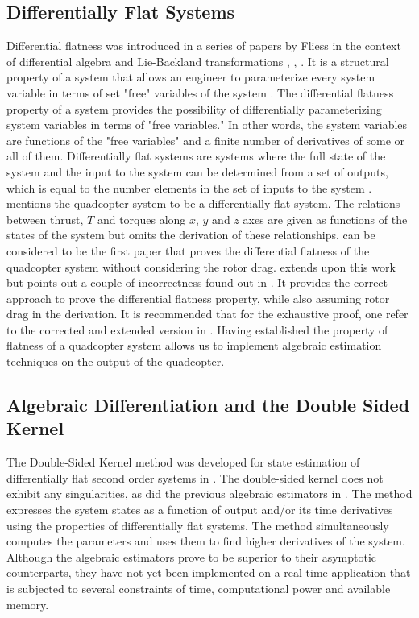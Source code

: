 \documentclass[letterpaper%
, twoside%
, 12pt%
,memoire%
, english%
,creativecommons,hyperref%
]{thETS}
\begin{document}
\begin{introduction}
\subsection{Differentially Flat Systems} \label{subsec:diffflatnessquad}
Differential flatness was introduced in a series of papers by Fliess in the context of differential algebra and Lie-Backland transformations \citep{RN78}, \citep{RN79}, \citep{RN80}. It is a structural property of a system that allows an engineer to parameterize every system variable in terms of set "free" variables of the system \citep{RN77}. 
The differential flatness property of a system provides the possibility of differentially parameterizing system variables in terms of "free variables." In other words, the system variables are functions of the "free variables" and a finite number of derivatives of some or all of them.
Differentially flat systems are systems where the full state of the system and the input to the system can be determined from a set of outputs, which is equal to the number elements in the set of inputs to the system \citep{RN73}. 
\citep{RN81} mentions the quadcopter system to be a differentially flat system.  The relations between thrust, $T$ and torques along  $x$, $y$ and $z$ axes are given as functions of the states of the system but omits the derivation of these relationships. \citep{mellinger2011minimum} can be considered to be the first paper that proves the differential flatness of the quadcopter system without considering the rotor drag. \citep{faessler2017differential} extends upon this work but points out a couple of incorrectness found out in \citep{mellinger2011minimum}. It provides the correct approach to prove the differential flatness property, while also assuming rotor drag in the derivation. It is recommended that for the exhaustive proof, one refer to the corrected and extended version in \citep{faessler2017differential}. Having established the property of flatness of a quadcopter system allows us to implement algebraic estimation techniques on the output of the quadcopter. 

\subsection{Algebraic Differentiation and the Double Sided Kernel}
The Double-Sided Kernel method was developed for state estimation of differentially flat second order systems in \citep{RN76}. The double-sided kernel does not exhibit any singularities, as did the previous algebraic estimators in \citep{RN75}. The method expresses the system states as a function of output and/or its time derivatives using the properties of differentially flat systems. The method simultaneously computes the parameters and uses them to find higher derivatives of the system.\\
Although the algebraic estimators prove to be superior to their asymptotic counterparts, they have not yet been implemented on a real-time application that is subjected to several constraints of time, computational power and available memory. 


\end{introduction}
\end{document}
